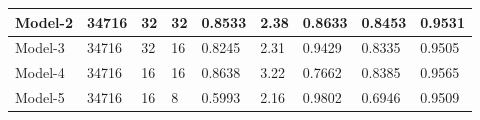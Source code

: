 \begin{table}[!htb]
\begin{center}
\begin{tabular}{|l|l|l|l|l|l|l|l|l|}
\textbf{Model-2}                & \textbf{34716}                                                  & \textbf{32}                                                        & \textbf{32}                                                        & \textbf{0.8533}   & \textbf{2.38}                                                     & \textbf{0.8633}      & \textbf{0.8453}                                              & \textbf{0.9531}                                               \\ \hline
Model-3                         & 34716                                                           & 32                                                                 & 16                                                                 & 0.8245            & 2.31                                                              & 0.9429               & 0.8335                                                       & 0.9505                                                        \\ \hline
Model-4                         & 34716                                                           & 16                                                                 & 16                                                                 & 0.8638            & 3.22                                                              & 0.7662               & 0.8385                                                       & 0.9565                                                        \\ \hline
Model-5                         & 34716                                                           & 16                                                                 & 8                                                                  & 0.5993            & 2.16                                                              & 0.9802               & 0.6946                                                       & 0.9509                                                        \\ \hline
\end{tabular}
\end{center}
\end{table}

